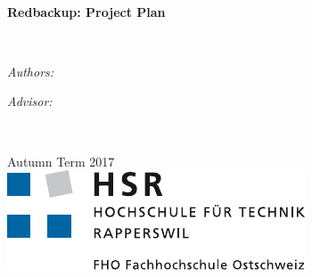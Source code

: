 

\usepackage{tabu}
\usepackage{rotating}
\usepackage{diagbox}
\usepackage{float}
\usepackage{multicol}
\usepackage{rotating}
\usepackage{url}



\frontmatter


\begin{titlepage}
\begin{center}
\vspace*{.06\textheight}

\HRule \\[0.4cm] %
{\huge \bfseries Redbackup: Project Plan\par}\vspace{0.4cm} %
\HRule \\[1.5cm] %

\begin{minipage}[t]{0.4\textwidth}
\begin{flushleft} \large
\emph{Authors:}\\
\authorname %
\end{flushleft}
\end{minipage}
\begin{minipage}[t]{0.4\textwidth}
\begin{flushright} \large
\emph{Advisor:} \\
\supname
\end{flushright}
\end{minipage}\\[3cm]

\vfill

{\large Autumn Term 2017}\\[4cm] %
\includegraphics{resources/logo_hsr} %

\vfill
\end{center}
\end{titlepage}


